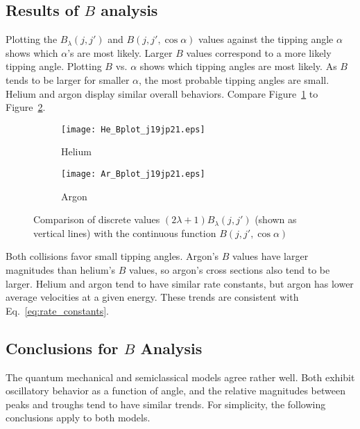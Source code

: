 \documentclass[letterpaper,11pt]{article}
\begin{document}
\subsection{Results of $B$ analysis}
Plotting the $B_\lambda(j,j')$ and $B(j,j',\cos\alpha)$ values against the tipping angle
$\alpha$ shows which $\alpha$'s are most likely.  Larger $B$ values correspond to
a more likely tipping angle.  Plotting $B$ vs. $\alpha$ shows which tipping angles
are most likely.  As $B$ tends to be larger for smaller $\alpha$, the most
probable tipping angles are small.  Helium and argon display similar overall
behaviors.  Compare Figure~\ref{fig:He_B_1921} to Figure~\ref{fig:Ar_B_1921}.
\begin{figure}[ht!]
    \centering
    \begin{subfigure}{0.49\textwidth}
        \texttt{[image: He\_Bplot\_j19jp21.eps]}
        \caption{Helium}
\label{fig:He_B_1921}
    \end{subfigure}
    \hspace*{\fill}
    \begin{subfigure}{0.49\textwidth}
        \texttt{[image: Ar\_Bplot\_j19jp21.eps]}
        \caption{Argon}
\label{fig:Ar_B_1921}
    \end{subfigure}
    \caption{Comparison of discrete values $(2\lambda+1)B_\lambda(j,j')$ (shown as vertical lines) with the continuous function $B(j,j',\cos\alpha)$}
\label{fig:B_plots}
\end{figure}
\newline Both collisions favor small tipping angles.  Argon's $B$ values have
larger magnitudes than helium's $B$ values, so argon's cross sections also tend
to be larger.  Helium and argon tend to have similar rate constants, but argon
has lower average velocities at a given energy.  These trends are consistent
with Eq.~\ref{eq:rate_constants}.

\subsection{Conclusions for $B$ Analysis}
The quantum mechanical and semiclassical models agree rather well.  Both
exhibit oscillatory behavior as a function of angle, and the relative
magnitudes between peaks and troughs tend to have similar trends.  For
simplicity, the following conclusions apply to both models.
\end{document}
